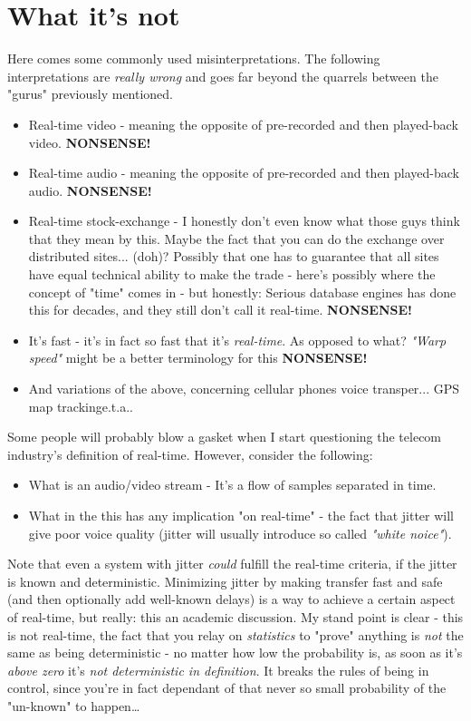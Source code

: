 \chapter{What it's not}
Here comes some commonly used misinterpretations. The following interpretations are \textit{really wrong} and goes far beyond the quarrels between the "gurus" previously mentioned.

\begin{itemize}
\item Real-time video - meaning the opposite of pre-recorded and then played-back video. \textbf{NONSENSE!}
\item  Real-time audio - meaning the opposite of pre-recorded and then played-back audio. \textbf{NONSENSE!}
\item  Real-time stock-exchange - I honestly don't even know what those guys think that they mean by this. Maybe the fact that you can do the exchange over distributed sites... (doh)? Possibly that one has to guarantee that all sites have equal technical ability to make the trade - here's possibly where the concept of "time" comes in - but honestly: Serious database engines has done this for decades, and they still don't call it real-time. \textbf{NONSENSE!}
\item  It's fast - it's in fact so fast that it's \textit{real-time}. As opposed to what? \textit{"Warp speed"} might be a better terminology for this \textbf{NONSENSE!}
\item  And variations of the above, concerning cellular phones voice transper... GPS map trackinge.t.a..
\end{itemize}
Some people will probably blow a gasket when I start questioning the telecom industry's definition of real-time. However, consider the following:

\begin{itemize}
\item  What is an audio/video stream - It's a flow of samples separated in time.
\item  What in the this has any implication "on real-time" - the fact that jitter will give poor voice quality (jitter will usually introduce so called \textit{"white noice"}). 
\end{itemize}
Note that even a system with jitter \textit{could} fulfill the real-time criteria, if the jitter is known and deterministic. Minimizing jitter by making transfer fast and safe (and then optionally add well-known delays) is a way to achieve a certain aspect of real-time, but really: this an academic discussion. My stand point is clear - this is not real-time, the fact that you relay on \textit{statistics} to "prove" anything is \textit{not} the same as being deterministic - no matter how low the probability is, as soon as it's \textit{above zero} it's \textit{not deterministic in definition}. It breaks the rules of being in control, since you're in fact dependant of that never so small probability of the "un-known" to happen\ldots


